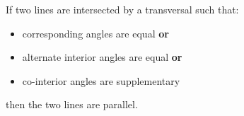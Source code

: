 If two lines are intersected by a transversal such that:
\begin{itemize}[noitemsep]
 \item corresponding angles are equal \newline \textbf{or}
\item alternate interior angles are equal \newline \textbf{or}
\item co-interior angles are supplementary
\end{itemize}
then the two lines are parallel.



